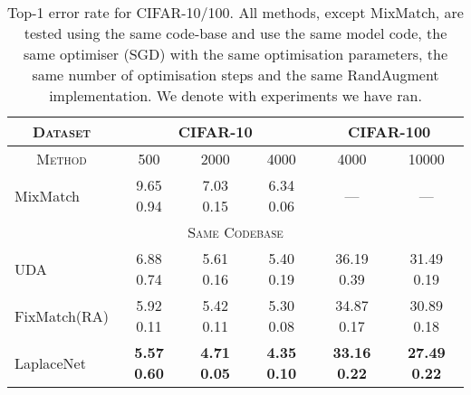 \documentclass[journal]{IEEEtran}
\begin{document}
\begin{table*}[t!]
  \centering
  \caption{Top-1 error rate for CIFAR-10/100. All methods, except MixMatch, are tested using the same code-base and use the same model code, the same optimiser (SGD) with the same optimisation parameters,  the same number of optimisation steps and the same RandAugment implementation. We denote with  experiments we have ran.}
  \begin{tabular}{|l|ccc|cc|}
  \hline \multicolumn{1}{|c}{\cellcolor{gray!25} \textsc{Dataset}} &  \multicolumn{3}{|c|}{\cellcolor{gray!25} \textsc{CIFAR-10}} & \multicolumn{2}{c|}{\cellcolor{gray!25} \textsc{CIFAR-100}}  \\ \hline
   \multicolumn{1}{|c|}{\cellcolor{gray!25} \textsc{Method}}  & \cellcolor{gray!25} 500 & \cellcolor{gray!25} 2000 & \cellcolor{gray!25} 4000 & \cellcolor{gray!25} 4000 & \multicolumn{1}{|c|}{\cellcolor{gray!25} \textsc{10000}} \\ \hline
    MixMatch & 9.65  0.94 & 7.03  0.15 & 6.34  0.06 & --- & ---  \\ \hline
    
    \multicolumn{6}{|c|}{\cellcolor{gray!25}\textsc{Same Codebase}}  \\ \hline
    UDA  & 6.88  0.74 & 5.61  0.16 & 5.40  0.19 & 36.19  0.39 & 31.49  0.19  \\ 
    FixMatch(RA)  & 5.92  0.11 & 5.42  0.11 & 5.30  0.08  &  34.87  0.17  &  30.89  0.18  \\ 
    LaplaceNet  & \textbf{5.57}  \textbf{0.60} & \textbf{4.71}  \textbf{0.05}  & \textbf{4.35}  \textbf{0.10} & \textbf{33.16}  \textbf{0.22} & \textbf{27.49}  \textbf{0.22} \\ \hline
  \end{tabular}
  \label{table:modern:cifar}
\end{table*}
\end{document}
